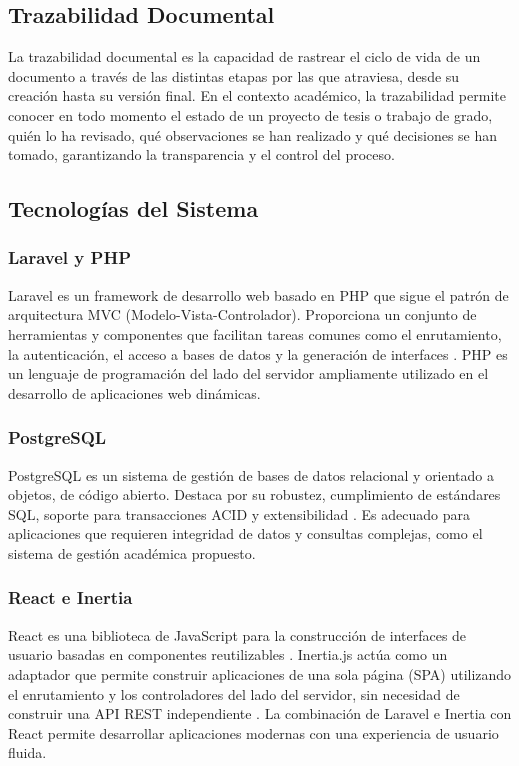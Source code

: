 \subsection{Trazabilidad Documental}

La trazabilidad documental es la capacidad de rastrear el ciclo de vida de un documento a través de las distintas etapas por las que atraviesa, desde su creación hasta su versión final. En el contexto académico, la trazabilidad permite conocer en todo momento el estado de un proyecto de tesis o trabajo de grado, quién lo ha revisado, qué observaciones se han realizado y qué decisiones se han tomado, garantizando la transparencia y el control del proceso.

\subsection{Tecnologías del Sistema}

\subsubsection{Laravel y PHP}

Laravel es un framework de desarrollo web basado en PHP que sigue el patrón de arquitectura MVC (Modelo-Vista-Controlador). Proporciona un conjunto de herramientas y componentes que facilitan tareas comunes como el enrutamiento, la autenticación, el acceso a bases de datos y la generación de interfaces \textcite{laravel2024docs}. PHP es un lenguaje de programación del lado del servidor ampliamente utilizado en el desarrollo de aplicaciones web dinámicas.

\subsubsection{PostgreSQL}

PostgreSQL es un sistema de gestión de bases de datos relacional y orientado a objetos, de código abierto. Destaca por su robustez, cumplimiento de estándares SQL, soporte para transacciones ACID y extensibilidad \textcite{postgresql2024docs}. Es adecuado para aplicaciones que requieren integridad de datos y consultas complejas, como el sistema de gestión académica propuesto.

\subsubsection{React e Inertia}

React es una biblioteca de JavaScript para la construcción de interfaces de usuario basadas en componentes reutilizables \textcite{react2024docs}. Inertia.js actúa como un adaptador que permite construir aplicaciones de una sola página (SPA) utilizando el enrutamiento y los controladores del lado del servidor, sin necesidad de construir una API REST independiente \textcite{inertia2024docs}. La combinación de Laravel e Inertia con React permite desarrollar aplicaciones modernas con una experiencia de usuario fluida.

